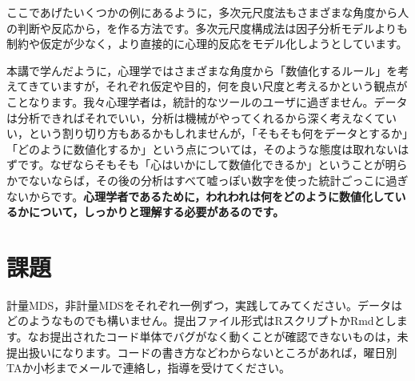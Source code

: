 \documentclass{ltjsbook}
\begin{document}
ここであげたいくつかの例にあるように，多次元尺度法もさまざまな角度から人の判断や反応から，を作る方法です。多次元尺度構成法は因子分析モデルよりも制約や仮定が少なく，より直接的に心理的反応をモデル化しようとしています。

本講で学んだように，心理学ではさまざまな角度から「数値化するルール」を考えてきていますが，それぞれ仮定や目的，何を良い尺度と考えるかという観点がことなります。我々心理学者は，統計的なツールのユーザに過ぎません。データは分析できればそれでいい，分析は機械がやってくれるから深く考えなくていい，という割り切り方もあるかもしれませんが，「そもそも何をデータとするか」「どのように数値化するか」という点については，そのような態度は取れないはずです。なぜならそもそも「心はいかにして数値化できるか」ということが明らかでないならば，その後の分析はすべて嘘っぽい数字を使った統計ごっこに過ぎないからです。\textbf{心理学者であるために，われわれは何をどのように数値化しているかについて，しっかりと理解する必要があるのです。}

\section{課題}
計量MDS，非計量MDSをそれぞれ一例ずつ，実践してみてください。データはどのようなものでも構いません。提出ファイル形式はRスクリプトかRmdとします。なお提出されたコード単体でバグがなく動くことが確認できないものは，未提出扱いになります。コードの書き方などわからないところがあれば，曜日別TAか小杉までメールで連絡し，指導を受けてください。
\end{document}

